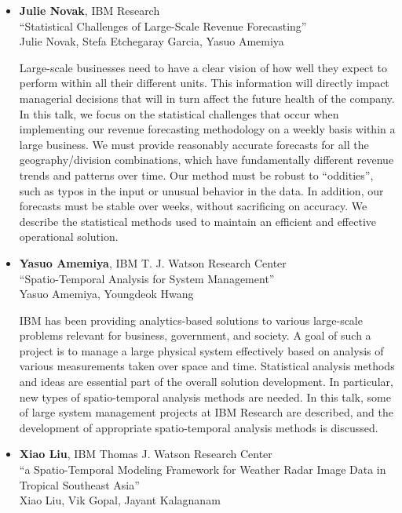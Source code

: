 \begin{itemize}
\item \textbf{Julie Novak}, IBM Research \\
``Statistical Challenges of Large-Scale Revenue Forecasting'' \\
Julie Novak, Stefa Etchegaray Garcia, Yasuo Amemiya


Large-scale businesses need to have a clear vision of how well they expect to perform within all their different units. This information will directly impact managerial decisions that will in turn affect the future health of the company. In this talk, we focus on the statistical challenges that occur when implementing our revenue forecasting methodology on a weekly basis within a large business. We must provide reasonably accurate forecasts for all the geography/division combinations, which have fundamentally different revenue trends and patterns over time. Our method must be robust to “oddities”, such as typos in the input or unusual behavior in the data. In addition, our forecasts must be stable over weeks, without sacrificing on accuracy. We describe the statistical methods used to maintain an efficient and effective operational solution. 

\item \textbf{Yasuo Amemiya}, IBM T. J. Watson Research Center \\
``Spatio-Temporal Analysis for System Management'' \\
Yasuo Amemiya, Youngdeok Hwang


IBM has been providing analytics-based solutions to various large-scale problems relevant for business, government, and society.  A goal of such a project is to manage a large physical system effectively based on analysis of various measurements taken over space and time.  Statistical analysis methods and ideas are essential part of the overall solution development.  In particular, new types of spatio-temporal analysis methods are needed.  In this talk, some of large system management projects at IBM Research are described, and the development of appropriate spatio-temporal analysis methods is discussed.

\item \textbf{Xiao Liu}, IBM Thomas J. Watson Research Center \\
``a Spatio-Temporal Modeling Framework for Weather Radar Image Data in Tropical Southeast Asia'' \\
Xiao Liu,   Vik Gopal,   Jayant Kalagnanam



\end{itemize}
